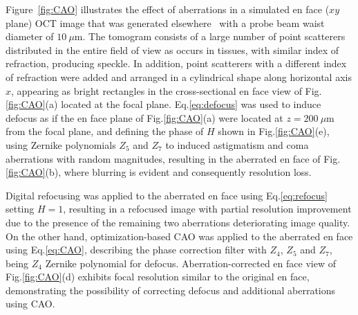 Figure~\ref{fig:CAO} illustrates the effect of aberrations in a simulated en face ($xy$ plane) OCT image that was generated elsewhere~\cite{Cuartas-Velez2017_Formacion} with a probe beam waist diameter of $10~\mu$m. The tomogram consists of a large number of point scatterers distributed in the entire field of view as occurs in tissues, with similar index of refraction, producing speckle. In addition, point scatterers with a different index of refraction were added and arranged in a cylindrical shape along horizontal axis $x$, appearing as bright rectangles in the cross-sectional en face view of Fig.\ref{fig:CAO}(a) located at the focal plane. Eq.\eqref{eq:defocus} was used to induce defocus as if the en face plane of Fig.\ref{fig:CAO}(a) were located at $z=200~\mu$m from the focal plane, and defining the phase of $H$ shown in Fig.\ref{fig:CAO}(e), using Zernike polynomials $Z_5$ and $Z_7$ to induced astigmatism and coma aberrations with random magnitudes, resulting in the aberrated en face of Fig.\ref{fig:CAO}(b), where blurring is evident and consequently resolution loss.

Digital refocusing was applied to the aberrated en face using Eq.\eqref{eq:refocus} setting $H=1$, resulting in a refocused image with partial resolution improvement due to the presence of the remaining two aberrations deteriorating image quality. On the other hand, optimization-based CAO was applied to the aberrated en face using Eq.\eqref{eq:CAO}, describing the phase correction filter with $Z_4$, $Z_5$ and $Z_7$, being $Z_4$ Zernike polynomial for defocus. Aberration-corrected en face view of Fig.\ref{fig:CAO}(d) exhibits focal resolution similar to the original en face, demonstrating the possibility of correcting defocus and additional aberrations using CAO.
 
